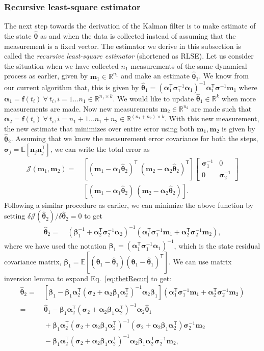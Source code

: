\documentclass{resonance}
\def\J{\mathcal{J}}
\def\R{\mathbb{R}}
\def\E{\mathbb{E}}
\def\th{\bm{\theta}}
\def\thh{\bm{\hat{\theta}}}
\def\n{\bm{n}}
\def\f{\bm{f}}
\def\m{\bm{m}}
\def\p{\bm{\beta}}
\def\T{\mathsf{T}}
\def\S{\bm{\sigma}}
\def\H{\bm{\alpha}}
\def\J{\mathcal{J}}
\def\E{\mathbb{E}}
\begin{document}
\subsubsection*{Recursive least-square estimator}
The next step towards the derivation of the Kalman filter is to make estimate of the state $\thh$ as and when the data is collected instead of assuming that the measurement is a fixed vector. The estimator we derive in this subsection is called the \textit{recursive least-square estimator} (shortened as RLSE). Let us consider the situation when we have collected $n_1$ measurements of the same dynamical process as earlier, given by $\m_1 \in \R^{n_1}$ and make an estimate $\thh_1$. We know from our current algorithm that, this is given by $\thh_1 =  (\H_1^\T \S_1^{-1} \H_1)^{-1} \H_1^\T \S^{-1} \m_1$ where $\H_1 = \f(t_i) \ \forall \ t_i, i = 1 \dots n_1 \in \R^{n_1 \times k}$. We would like to update $\thh_1 \in \R^{k}$ when more measurements are made. Now new measurements $\m_2 \in \R^{n_2}$ are made such that $\H_2 =  \f(t_i) \ \forall \ t_i, i = n_1+1 \dots n_1+n_2 \in \R^{(n_1+n_2) \times k}$. With this new measurement, the new estimate that minimizes over entire error using both $\m_1, \m_2$ is given by $\thh_2$. Assuming that we know the measurement error covariance for both the steps, $\S_j=\E[\n_j\n_j^\T]$, we can write the total error as
\begin{align}
\J(\m_1, \m_2) =& \ [ (\m_1-\H_1 \thh_2)^\T \ (\m_2-\H_2\thh_2)^\T ]
\begin{bmatrix}
    \S_1^{-1} & 0 \\
    0 & \S_2^{-1}
\end{bmatrix} \nonumber \\
& \ [ (\m_1-\H_1 \thh_2) \ (\m_2-\H_2\thh_2) ].
\end{align}
Following a similar procedure as earlier, we can minimize the above function by setting $\delta \J(\thh_2)/\delta \thh_2 =0$ to get
\begin{align}
\thh_2=& \ (\p_1^{-1} + \H_2^\T \S_2^{-1} \H_2)^{-1} (\H_1^\T \S_1^{-1} \m_1 + \H_2^\T \S_2^{-1} \m_2), \label{eq:thetRecur}
\end{align}
where we have used the notation $\p_1 = (\H_1^\T \S_1^{-1} \H_1)^{-1}$, which is the state residual covariance matrix, $\p_1=\E[(\th_1-\hat{\th}_1)(\th_1-\hat{\th}_1)^\T]$. We can use matrix inversion lemma to expand Eq.~\ref{eq:thetRecur} to get:
\begin{align*}
\thh_2 =& \ [\p_1 - \p_1 \H_2^\T(\S_2 + \H_2 \p_1 \H_2^\T)^{-1} \H_2 \p_1] (\H_1^\T \S_1^{-1} \m_1 + \H_2^\T \S_2^{-1} \m_2) \\
=& \ \thh_1 - \p_1 \H_2^\T(\S_2 + \H_2 \p_1 \H_2^\T)^{-1} \H_2 \thh_1 \nonumber\\
& \ + \p_1 \H_2^\T (\S_2 + \H_2 \p_1 \H_2^\T)^{-1}  (\S_2 + \H_2 \p_1 \H_2^\T) \S_2^{-1} \m_2 \\
& \ - \p_1 \H_2^\T(\S_2 + \H_2 \p_1 \H_2^\T)^{-1} \H_2 \p_1 \H_2^\T \S_2^{-1}\m_2,
\end{align*} 
\end{document}
